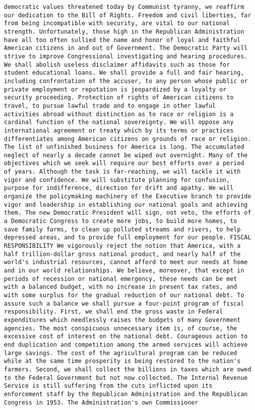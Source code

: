 \documentclass[
]{article}
\begin{document}
\begin{verbatim}
democratic values threatened today by Communist tyranny, we reaffirm our dedication to the Bill of Rights. Freedom and civil liberties, far from being incompatible with security, are vital to our national strength. Unfortunately, those high in the Republican Administration have all too often sullied the name and honor of loyal and faithful American citizens in and out of Government. The Democratic Party will strive to improve Congressional investigating and hearing procedures. We shall abolish useless disclaimer affidavits such as those for student educational loans. We shall provide a full and fair hearing, including confrontation of the accuser, to any person whose public or private employment or reputation is jeopardized by a loyalty or security proceeding. Protection of rights of American citizens to travel, to pursue lawful trade and to engage in other lawful activities abroad without distinction as to race or religion is a cardinal function of the national sovereignty. We will oppose any international agreement or treaty which by its terms or practices differentiates among American citizens on grounds of race or religion. The list of unfinished business for America is long. The accumulated neglect of nearly a decade cannot be wiped out overnight. Many of the objectives which we seek will require our best efforts over a period of years. Although the task is far-reaching, we will tackle it with vigor and confidence. We will substitute planning for confusion, purpose for indifference, direction for drift and apathy. We will organize the policymaking machinery of the Executive branch to provide vigor and leadership in establishing our national goals and achieving them. The new Democratic President will sign, not veto, the efforts of a Democratic Congress to create more jobs, to build more homes, to save family farms, to clean up polluted streams and rivers, to help depressed areas, and to provide full employment for our people. FISCAL RESPONSIBILITY We vigorously reject the notion that America, with a half trillion-dollar gross national product, and nearly half of the world's industrial resources, cannot afford to meet our needs at home and in our world relationships. We believe, moreover, that except in periods of recession or national emergency, these needs can be met with a balanced budget, with no increase in present tax rates, and with some surplus for the gradual reduction of our national debt. To assure such a balance we shall pursue a four-point program of fiscal responsibility. First, we shall end the gross waste in Federal expenditures which needlessly raises the budgets of many Government agencies. The most conspicuous unnecessary item is, of course, the excessive cost of interest on the national debt. Courageous action to end duplication and competition among the armed services will achieve large savings. The cost of the agricultural program can be reduced while at the same time prosperity is being restored to the nation's farmers. Second, we shall collect the billions in taxes which are owed to the Federal Government but not now collected. The Internal Revenue Service is still suffering from the cuts inflicted upon its enforcement staff by the Republican Administration and the Republican Congress in 1953. The Administration's own Commissioner 
\end{verbatim}
\end{document}
